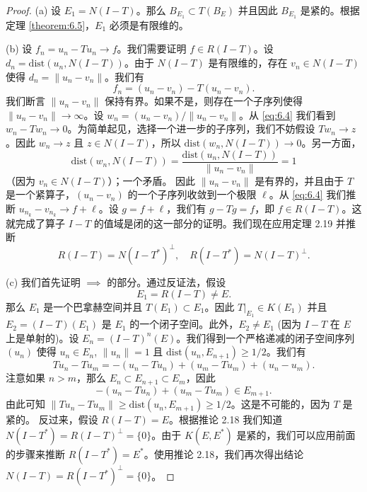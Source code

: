 \begin{proof}
(a) 设 \(E_1 = N(I-T)\)。那么 \(B_{E_1} \subset T(B_E)\) 并且因此 \(B_{E_1}\) 是紧的。根据定理 \ref{theorem:6.5}，\(E_1\) 必须是有限维的。

(b) 设 \(f_n = u_n - Tu_n \to f\)。我们需要证明 \(f \in R(I-T)\)。设 \(d_n = \mathrm{dist}(u_n, N(I-T))\)。由于 \(N(I-T)\) 是有限维的，存在 \(v_n \in N(I-T)\) 使得 \(d_n = \|u_n - v_n\|\)。我们有
\begin{equation}\label{eq:6.4}
f_n = (u_n - v_n) - T(u_n - v_n).
\end{equation}
我们断言 \(\|u_n - v_n\|\) 保持有界。如果不是，则存在一个子序列使得 \(\|u_n - v_n\| \to \infty\)。设 \(w_n = (u_n - v_n) / \|u_n - v_n\|\)。从 \eqref{eq:6.4} 我们看到 \(w_n - Tw_n \to 0\)。为简单起见，选择一个进一步的子序列，我们不妨假设 \(Tw_n \to z\)。因此 \(w_n \to z\) 且 \(z \in N(I-T)\)，所以 \(\mathrm{dist}(w_n, N(I-T)) \to 0\)。另一方面，
\[
\mathrm{dist}(w_n, N(I-T)) = \frac{\mathrm{dist}(u_n, N(I-T))}{\|u_n - v_n\|} = 1
\]
（因为 \(v_n \in N(I-T)\)）；一个矛盾。
因此 \(\|u_n-v_n\|\) 是有界的，并且由于 \(T\) 是一个紧算子，\((u_n-v_n)\) 的一个子序列收敛到一个极限 \(\ell\)。从 \eqref{eq:6.4} 我们推断 \(u_{n_k}-v_{n_k} \to f + \ell\)。设 \(g=f+\ell\)，我们有 \(g-Tg=f\)，即 \(f \in R(I-T)\)。这就完成了算子 \(I-T\) 的值域是闭的这一部分的证明。我们现在应用定理 2.19 并推断
\[
R(I-T) = N(I-T^*)^\perp, \quad R(I-T^*) = N(I-T)^\perp.
\]

(c) 我们首先证明 \(\implies\) 的部分。通过反证法，假设
\[
E_1 = R(I-T) \ne E.
\]
那么 \(E_1\) 是一个巴拿赫空间并且 \(T(E_1) \subset E_1\)。因此 \(T|_{E_1} \in K(E_1)\) 并且 \(E_2 = (I-T)(E_1)\) 是 \(E_1\) 的一个闭子空间。此外，\(E_2 \ne E_1\) (因为 \(I-T\) 在 \(E\) 上是单射的)。设 \(E_n = (I-T)^n(E)\)。我们得到一个严格递减的闭子空间序列 \((u_n)\) 使得 \(u_n \in E_n\), \(\|u_n\|=1\) 且 \(\mathrm{dist}(u_n, E_{n+1}) \ge 1/2\)。我们有
\[
Tu_n - Tu_m = -(u_n - Tu_n) + (u_m - Tu_m) + (u_n-u_m).
\]
注意如果 \(n>m\)，那么 \(E_n \subset E_{n+1} \subset E_m\)，因此
\[
-(u_n-Tu_n) + (u_m-Tu_m) \in E_{m+1}.
\]
由此可知 \(\|Tu_n - Tu_m\| \ge \mathrm{dist}(u_n, E_{m+1}) \ge 1/2\)。这是不可能的，因为 \(T\) 是紧的。
反过来，假设 \(R(I-T)=E\)。根据推论 2.18 我们知道 \(N(I-T^*) = R(I-T)^\perp = \{0\}\)。由于 \(K(E,E^*)\) 是紧的，我们可以应用前面的步骤来推断 \(R(I-T^*) = E^*\)。使用推论 2.18，我们再次得出结论 \(N(I-T)=R(I-T^*)^\perp=\{0\}\)。


\end{proof}
